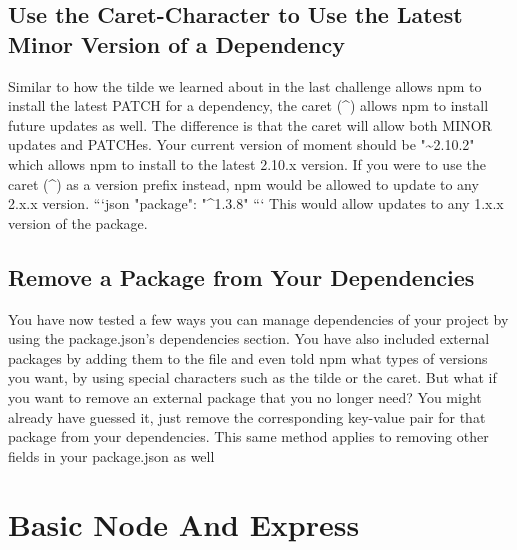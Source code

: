 \documentclass{article}%
\begin{document}
%
\subsection{Use the Caret{-}Character to Use the Latest Minor Version of a Dependency}%
\label{subsec:UsetheCaret{-}CharactertoUsetheLatestMinorVersionofaDependency}%
Similar to how the tilde we learned about in the last challenge allows npm to install the latest PATCH for a dependency, the caret (\^{}) allows npm to install future updates as well. The difference is that the caret will allow both MINOR updates and PATCHes.\newline%
Your current version of moment should be "\textasciitilde{}2.10.2" which allows npm to install to the latest 2.10.x version. If you were to use the caret (\^{}) as a version prefix instead, npm would be allowed to update to any 2.x.x version.\newline%
```json\newline%
"package": "\^{}1.3.8"\newline%
```\newline%
This would allow updates to any 1.x.x version of the package.\newline%

%
\subsection{Remove a Package from Your Dependencies}%
\label{subsec:RemoveaPackagefromYourDependencies}%
You have now tested a few ways you can manage dependencies of your project by using the package.json's dependencies section. You have also included external packages by adding them to the file and even told npm what types of versions you want, by using special characters such as the tilde or the caret.\newline%
But what if you want to remove an external package that you no longer need? You might already have guessed it, just remove the corresponding key{-}value pair for that package from your dependencies.\newline%
This same method applies to removing other fields in your package.json as well\newline%

%
\newpage%
\section{Basic Node And Express}%
\label{sec:BasicNodeAndExpress}%
\end{document}
